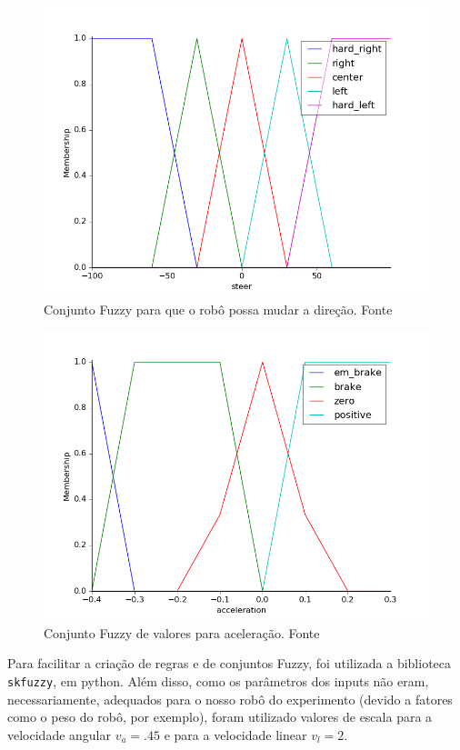 \documentclass[twoside,conference,a4paper]{IEEEtran}
\begin{document}
\begin{figure}[ht!]
  \centering
  \includegraphics[width=1\hsize]{figuras/steer.png}
  \caption{Conjunto Fuzzy para que o robô possa mudar a direção. Fonte \cite{Reinhard:1995}}
  \label{fig:fig4}
\end{figure}

\begin{figure}[ht!]
  \centering
  \includegraphics[width=1\hsize]{figuras/acc.png}
  \caption{Conjunto Fuzzy de valores para aceleração. Fonte \cite{Reinhard:1995}}
  \label{fig:fig5}
\end{figure}

Para facilitar a criação de regras e de conjuntos Fuzzy, foi utilizada a biblioteca \texttt{skfuzzy}, em python. Além disso, como os parâmetros dos inputs não eram, necessariamente, adequados para o nosso robô do experimento (devido a fatores como o peso do robô, por exemplo), foram utilizado valores de escala para a velocidade angular $v_{a} = .45$ e para a velocidade linear $v_{l} = 2$. 
\end{document}
